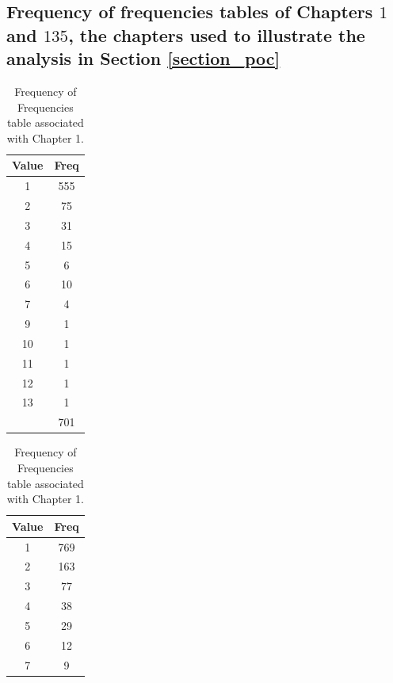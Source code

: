 \documentclass{article}
\begin{document}
\begin{appendices}
%
\section{Frequency of frequencies tables of Chapters $1$ and $135$, the chapters used to illustrate the analysis in Section \ref{section_poc}}
\label{app_poc}
\begin{table}[htp!]
\label{tab:freq}
\centering  
\begin{minipage}{0.45\linewidth}  %
\centering
\begin{tabular}{cc}
  \hline
  \textbf{Value} & \textbf{Freq} \\
  \hline
  1  & 555 \\
  2  & 75  \\
  3  & 31  \\
  4  & 15  \\
  5  & 6   \\
  6  & 10  \\
  7  & 4   \\
  9  & 1   \\
  10 & 1   \\
  11 & 1   \\
  12 & 1   \\
  13 & 1   \\
  \hline
  & 701\\
  \hline
\end{tabular}
\caption{Frequency of Frequencies table associated with Chapter 1.}
\label{tab:freq_chapter1}
\end{minipage}
\hspace{0.05\linewidth}  %
\begin{minipage}{0.45\linewidth}  %
\centering
\begin{tabular}{cc}
  \hline
  \textbf{Value} & \textbf{Freq} \\
  \hline
  1  & 769 \\
  2  & 163 \\
  3  & 77  \\
  4  & 38  \\
  5  & 29  \\
  6  & 12  \\
  7  & 9   \\

\end{tabular}
\end{minipage}
\end{table}
\end{appendices}
\end{document}
